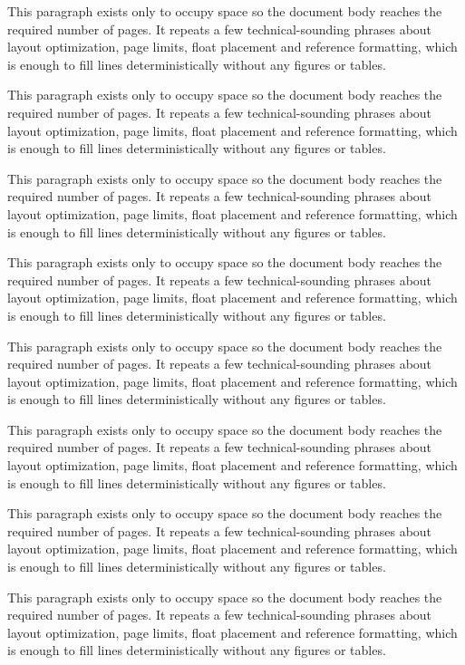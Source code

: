 \documentclass[10pt,letterpaper]{article}
\begin{document}
This paragraph exists only to occupy space so the document body reaches the required number of pages. It repeats a few technical-sounding phrases about layout optimization, page limits, float placement and reference formatting, which is enough to fill lines deterministically without any figures or tables.

This paragraph exists only to occupy space so the document body reaches the required number of pages. It repeats a few technical-sounding phrases about layout optimization, page limits, float placement and reference formatting, which is enough to fill lines deterministically without any figures or tables.

This paragraph exists only to occupy space so the document body reaches the required number of pages. It repeats a few technical-sounding phrases about layout optimization, page limits, float placement and reference formatting, which is enough to fill lines deterministically without any figures or tables.

This paragraph exists only to occupy space so the document body reaches the required number of pages. It repeats a few technical-sounding phrases about layout optimization, page limits, float placement and reference formatting, which is enough to fill lines deterministically without any figures or tables.

This paragraph exists only to occupy space so the document body reaches the required number of pages. It repeats a few technical-sounding phrases about layout optimization, page limits, float placement and reference formatting, which is enough to fill lines deterministically without any figures or tables.

This paragraph exists only to occupy space so the document body reaches the required number of pages. It repeats a few technical-sounding phrases about layout optimization, page limits, float placement and reference formatting, which is enough to fill lines deterministically without any figures or tables.

This paragraph exists only to occupy space so the document body reaches the required number of pages. It repeats a few technical-sounding phrases about layout optimization, page limits, float placement and reference formatting, which is enough to fill lines deterministically without any figures or tables.

This paragraph exists only to occupy space so the document body reaches the required number of pages. It repeats a few technical-sounding phrases about layout optimization, page limits, float placement and reference formatting, which is enough to fill lines deterministically without any figures or tables.
\end{document}

